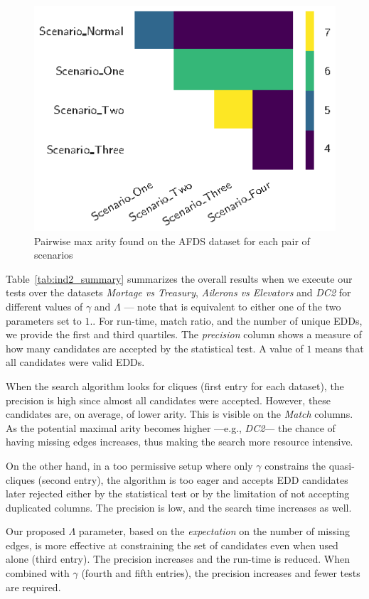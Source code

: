 \begin{figure}[ht]
    \centering
    \includegraphics[width=0.5\linewidth]{images/presq/afds}
    \caption{
        Pairwise max arity found on the AFDS dataset for each pair of scenarios
    }
    \label{fig:afds}
\end{figure}

Table~\ref{tab:ind2_summary} summarizes the overall results when
we execute our tests over the datasets \emph{Mortage vs Treasury},
\emph{Ailerons vs Elevators} and \emph{DC2} for different values of $\gamma$ and $\Lambda$ ---
note that \Find is equivalent to either one of the two parameters set to $1.$. For run-time,
match ratio, and the number of unique EDDs, we provide the first and third quartiles.
The \emph{precision} column shows a measure of how many candidates are accepted by the
statistical test. A value of $1$ means that all candidates were valid EDDs.

When the search algorithm looks for cliques (first entry for each dataset),
the precision is high since almost all candidates were accepted. However,
these candidates are, on average, of lower arity. This is visible on the \emph{Match}
columns. As the potential maximal arity becomes higher ---e.g., \emph{DC2}--- the
chance of having missing edges increases, thus making the search more resource intensive.

On the other hand, in a too permissive setup where only $\gamma$ constrains the quasi-cliques
(second entry), the algorithm is too eager and accepts EDD candidates later rejected either
by the statistical test or by the limitation of not accepting duplicated columns.
The precision is low, and the search time increases as well.

Our proposed $\Lambda$ parameter, based on the \emph{expectation} on the number of missing edges,
is more effective at constraining the set of candidates even when used alone (third entry).
The precision increases and the run-time is reduced.
When combined with $\gamma$ (fourth and fifth entries), the precision increases and fewer
tests are required.

